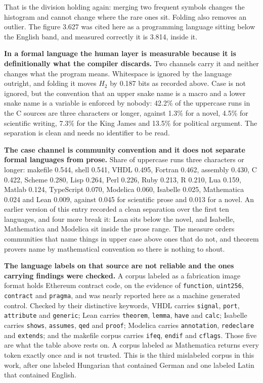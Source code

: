 That is the division holding again: merging two frequent symbols changes the histogram and cannot change where the rare ones sit. Folding also removes an outlier. The figure 3.627 was cited here as a programming language sitting below the English band, and measured correctly it is 3.814, inside it.

\textbf{In a formal language the human layer is measurable because it is definitionally what the compiler discards.} Two channels carry it and neither changes what the program means. Whitespace is ignored by the language outright, and folding it moves \(H_2\) by 0.187 bits as recorded above. Case is not ignored, but the convention that an upper snake name is a macro and a lower snake name is a variable is enforced by nobody: 42.2\% of the uppercase runs in the C sources are three characters or longer, against 1.3\% for a novel, 4.5\% for scientific writing, 7.3\% for the King James and 13.5\% for political argument. The separation is clean and needs no identifier to be read.

\textbf{The case channel is community convention and it does not separate formal languages from prose.} Share of uppercase runs three characters or longer: makefile 0.544, shell 0.541, VHDL 0.495, Fortran 0.462, assembly 0.430, C 0.422, Scheme 0.280, Lisp 0.264, Perl 0.226, Ruby 0.213, R 0.210, Lua 0.159, Matlab 0.124, TypeScript 0.070, Modelica 0.060, Isabelle 0.025, Mathematica 0.024 and Lean 0.009, against 0.045 for scientific prose and 0.013 for a novel. An earlier version of this entry recorded a clean separation over the first ten languages, and four more break it: Lean sits below the novel, and Isabelle, Mathematica and Modelica sit inside the prose range. The measure orders communities that name things in upper case above ones that do not, and theorem provers name by mathematical convention so there is nothing to shout.

\textbf{The language labels on that source are not reliable and the ones carrying findings were checked.} A corpus labeled as a fabrication image format holds Ethereum contract code, on the evidence of \texttt{function}, \texttt{uint256}, \texttt{contract} and \texttt{pragma}, and was nearly reported here as a machine generated control. Checked by their distinctive keywords, VHDL carries \texttt{signal}, \texttt{port}, \texttt{attribute} and \texttt{generic}; Lean carries \texttt{theorem}, \texttt{lemma}, \texttt{have} and \texttt{calc}; Isabelle carries \texttt{shows}, \texttt{assumes}, \texttt{qed} and \texttt{proof}; Modelica carries \texttt{annotation}, \texttt{redeclare} and \texttt{extends}; and the makefile corpus carries \texttt{ifeq}, \texttt{endif} and \texttt{cflags}. Those five are what the table above rests on. A corpus labeled as Mathematica returns every token exactly once and is not trusted. This is the third mislabeled corpus in this work, after one labeled Hungarian that contained German and one labeled Latin that contained English.

